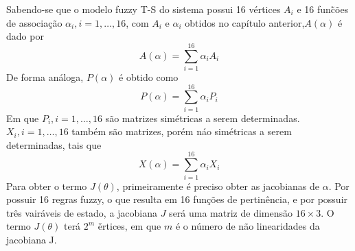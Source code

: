 Sabendo-se que o modelo fuzzy T-S do sistema possui 16 vértices $A_i$ e 16 fun\~{c}ões de associação $\alpha_i, i = 1, \hdots, 16$, com $A_i$ e $\alpha_i$ obtidos no capítulo anterior,$A(\alpha)$ é dado por
\begin{equation*}
A(\alpha) = \sum_{i = 1}^{16}\alpha_iA_i
\end{equation*}
De forma análoga, $P(\alpha)$ é obtido como
\begin{equation*}
P(\alpha) = \sum_{i = 1}^{16}\alpha_iP_i
\end{equation*}
Em que $P_i, i = 1,\hdots, 16$ são matrizes simétricas a serem determinadas. $X_i, i = 1,\hdots,16$ também são matrizes, porém náo simétricas a serem determinadas, tais que
\begin{equation*}
X(\alpha) = \sum_{i = 1}^{16}\alpha_iX_i
\end{equation*}
Para obter o termo $J(\theta)$, primeiramente é preciso obter as jacobianas de $\alpha$. Por possuir 16 regras fuzzy, o que resulta em 16 funções de pertinência, e por possuir três vairáveis de estado, a jacobiana $J$ será uma matriz de dimensão $16 \times 3$. O termo $J(\theta)$ terá $2^m$ \v{e}rtices, em que $m$ é o número de não linearidades da jacobiana J.

